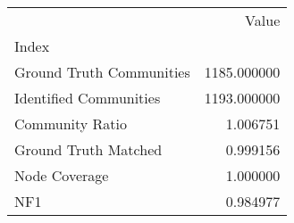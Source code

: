 \begin{tabular}{lr}
\toprule
{} &        Value \\
Index                    &              \\
\midrule
Ground Truth Communities &  1185.000000 \\
Identified Communities   &  1193.000000 \\
Community Ratio          &     1.006751 \\
Ground Truth Matched     &     0.999156 \\
Node Coverage            &     1.000000 \\
NF1                      &     0.984977 \\
\bottomrule
\end{tabular}
